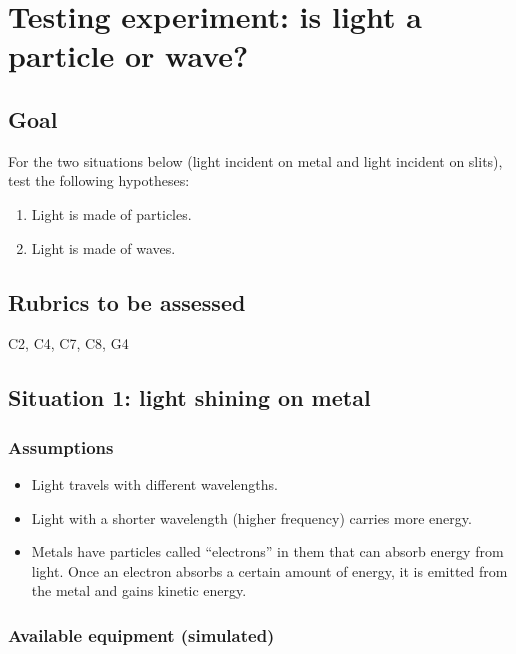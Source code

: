 \section{Testing experiment: is light a particle or wave?}

\subsection{Goal}

For the two situations below (light incident on metal and light incident on slits), test the following hypotheses:
\begin{enumerate}[label=(\Alph*)]
	\item\label{lpw:hyp:part} Light is made of particles.
	\item\label{lpw:hyp:wave} Light is made of waves.
\end{enumerate}

\subsection{Rubrics to be assessed}

C2, C4, C7, C8, G4

\subsection{Situation 1: light shining on metal}

\subsubsection{Assumptions}

\begin{itemize}
	\item Light travels with different wavelengths.
	
	\item Light with a shorter wavelength (higher frequency) carries more energy.
	
	\item Metals have particles called ``electrons'' in them that can absorb energy from light. Once an electron absorbs a certain amount of energy, it is emitted from the metal and gains kinetic energy.
\end{itemize}

\subsubsection{Available equipment (simulated)}

